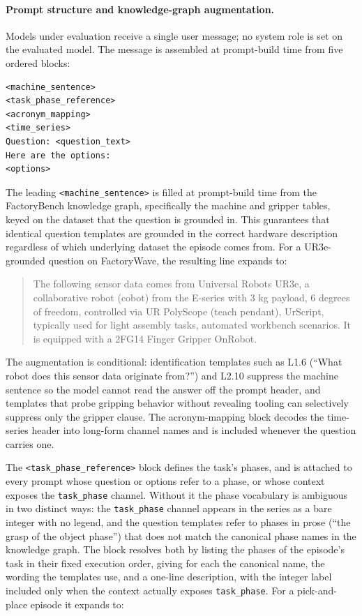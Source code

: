 \paragraph{Prompt structure and knowledge-graph augmentation.}
Models under evaluation receive a single user message; no system role is set on the evaluated model. The message is assembled at prompt-build time from five ordered blocks:

\begin{verbatim}
<machine_sentence>
<task_phase_reference>
<acronym_mapping>
<time_series>
Question: <question_text>
Here are the options:
<options>
\end{verbatim}

\noindent The leading \texttt{<machine\_sentence>} is filled at prompt-build time from the FactoryBench knowledge graph, specifically the machine and gripper tables, keyed on the dataset that the question is grounded in. This guarantees that identical question templates are grounded in the correct hardware description regardless of which underlying dataset the episode comes from. For a UR3e-grounded question on FactoryWave, the resulting line expands to:

\begin{quote}\small
    The following sensor data comes from Universal Robots UR3e, a collaborative robot (cobot) from the E-series with 3 kg payload, 6 degrees of freedom, controlled via UR PolyScope (teach pendant), UrScript, typically used for light assembly tasks, automated workbench scenarios. It is equipped with a 2FG14 Finger Gripper OnRobot.
\end{quote}

\noindent The augmentation is conditional: identification templates such as L1.6 (``What robot does this sensor data originate from?'') and L2.10 suppress the machine sentence so the model cannot read the answer off the prompt header, and templates that probe gripping behavior without revealing tooling can selectively suppress only the gripper clause. The acronym-mapping block decodes the time-series header into long-form channel names and is included whenever the question carries one.

\noindent The \texttt{<task\_phase\_reference>} block defines the task's phases, and is attached to every prompt whose question or options refer to a phase, or whose context exposes the \texttt{task\_phase} channel. Without it the phase vocabulary is ambiguous in two distinct ways: the \texttt{task\_phase} channel appears in the series as a bare integer with no legend, and the question templates refer to phases in prose (``the grasp of the object phase'') that does not match the canonical phase names in the knowledge graph. The block resolves both by listing the phases of the episode's task in their fixed execution order, giving for each the canonical name, the wording the templates use, and a one-line description, with the integer label included only when the context actually exposes \texttt{task\_phase}. For a pick-and-place episode it expands to:

